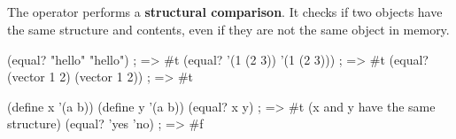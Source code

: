 \subsection{}
The  operator performs a \textbf{structural comparison}. It checks if two objects have the same structure and contents, even if they are not the same object in memory.

\begin{racketcode}
(equal? "hello" "hello") ; => #t
(equal? '(1 (2 3)) '(1 (2 3))) ; => #t
(equal? (vector 1 2) (vector 1 2)) ; => #t

(define x '(a b))
(define y '(a b))
(equal? x y) ; => #t (x and y have the same structure)
(equal? 'yes 'no) ; => #f
\end{racketcode}